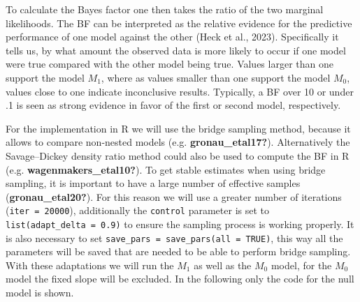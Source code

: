 \documentclass[
  doc,12pt,floatsintext]{apa7}
\newenvironment{Shaded}{\begin{snugshade}}{\end{snugshade}}
\newcommand{\AttributeTok}[1]{\textcolor[rgb]{0.13,0.29,0.53}{#1}}
\newcommand{\CommentTok}[1]{\textcolor[rgb]{0.56,0.35,0.01}{\textit{#1}}}
\newcommand{\ConstantTok}[1]{\textcolor[rgb]{0.56,0.35,0.01}{#1}}
\newcommand{\DecValTok}[1]{\textcolor[rgb]{0.00,0.00,0.81}{#1}}
\newcommand{\FloatTok}[1]{\textcolor[rgb]{0.00,0.00,0.81}{#1}}
\newcommand{\FunctionTok}[1]{\textcolor[rgb]{0.13,0.29,0.53}{\textbf{#1}}}
\newcommand{\NormalTok}[1]{#1}
\newcommand{\OtherTok}[1]{\textcolor[rgb]{0.56,0.35,0.01}{#1}}
\newcommand{\SpecialCharTok}[1]{\textcolor[rgb]{0.81,0.36,0.00}{\textbf{#1}}}
\newcommand{\StringTok}[1]{\textcolor[rgb]{0.31,0.60,0.02}{#1}}
\begin{document}
To calculate the Bayes factor one then takes the ratio of the two marginal likelihoods. The BF can be interpreted as the relative evidence for the predictive performance of one model against the other (Heck et al., 2023). Specifically it tells us, by what amount the observed data is more likely to occur if one model were true compared with the other model being true. Values larger than one support the model \(M_1\), where as values smaller than one support the model \(M_0\), values close to one indicate inconclusive results. Typically, a BF over 10 or under .1 is seen as strong evidence in favor of the first or second model, respectively.

For the implementation in R we will use the bridge sampling method, because it allows to compare non-nested models (e.g. \textbf{gronau\_etal17?}). Alternatively the Savage--Dickey density ratio method could also be used to compute the BF in R (e.g. \textbf{wagenmakers\_etal10?}). To get stable estimates when using bridge sampling, it is important to have a large number of effective samples (\textbf{gronau\_etal20?}). For this reason we will use a greater number of iterations (\texttt{iter\ =\ 20000}), additionally the \texttt{control} parameter is set to \texttt{list(adapt\_delta\ =\ 0.9)} to ensure the sampling process is working properly. It is also necessary to set \texttt{save\_pars\ =\ save\_pars(all\ =\ TRUE)}, this way all the parameters will be saved that are needed to be able to perform bridge sampling. With these adaptations we will run the \(M_1\) as well as the \(M_0\) model, for the \(M_0\) model the fixed slope will be excluded. In the following only the code for the null model is shown.

\begin{Shaded}
\end{Shaded}
\end{document}

